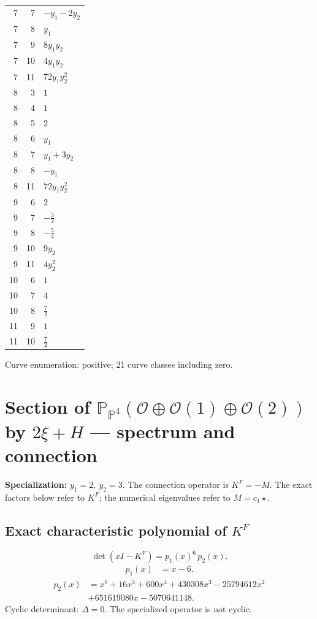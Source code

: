 \documentclass[10pt,a4paper]{article}
\begin{document}
{\begin{longtable}{rrp{125mm}}
7 & 7 & $- y_{1} - 2 y_{2}$\\
7 & 8 & $y_{1}$\\
7 & 9 & $8 y_{1} y_{2}$\\
7 & 10 & $4 y_{1} y_{2}$\\
7 & 11 & $72 y_{1} y_{2}^{2}$\\
8 & 3 & $1$\\
8 & 4 & $1$\\
8 & 5 & $2$\\
8 & 6 & $y_{1}$\\
8 & 7 & $y_{1} + 3 y_{2}$\\
8 & 8 & $- y_{1}$\\
8 & 11 & $72 y_{1} y_{2}^{2}$\\
9 & 6 & $2$\\
9 & 7 & $- \frac{5}{2}$\\
9 & 8 & $- \frac{5}{4}$\\
9 & 10 & $9 y_{2}$\\
9 & 11 & $4 y_{2}^{2}$\\
10 & 6 & $1$\\
10 & 7 & $4$\\
10 & 8 & $\frac{7}{2}$\\
11 & 9 & $1$\\
11 & 10 & $\frac{7}{2}$\\
\end{longtable}}
Curve enumeration: positive; 21 curve classes including zero.
\clearpage\section*{Section of $\mathbb P_{\mathbb P^{4}}(\mathcal O\oplus \mathcal O(1)\oplus \mathcal O(2))$ by $2\xi +H$ --- spectrum and connection}
\textbf{Specialization:} $y_1=2,\ y_2=3$. The connection operator is $K^F=-M$. The exact factors below refer to $K^F$; the numerical eigenvalues refer to $M=c_1\star$.
\subsection*{Exact characteristic polynomial of $K^F$}
\[\det(xI-K^F)=p_{1}(x)^{6}\,p_{2}(x).\]
\[\begin{aligned}p_{1}(x)&=x - 6.\end{aligned}\]
\[\begin{aligned}p_{2}(x)&=x^{6} + 16 x^{5} + 600 x^{4} + 430308 x^{3} - 25794612 x^{2}\\&+651619080 x - 5070641148.\end{aligned}\]
Cyclic determinant: $\Delta=0$. The specialized operator is not cyclic.
\end{document}
